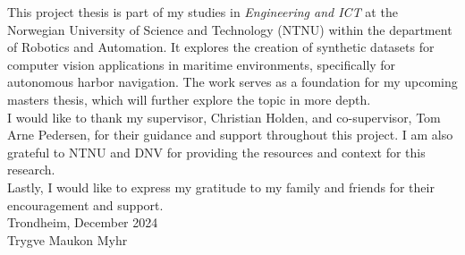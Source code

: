 
This project thesis is part of my studies in \textit{Engineering and ICT} at the Norwegian University of Science and Technology (NTNU) within the department of Robotics and Automation. It explores the creation of synthetic datasets for computer vision applications in maritime environments, specifically for autonomous harbor navigation. The work serves as a foundation for my upcoming masters thesis, which will further explore the topic in more depth.\\

\noindent I would like to thank my supervisor, Christian Holden, and co-supervisor, Tom Arne Pedersen, for their guidance and support throughout this project. I am also grateful to NTNU and DNV for providing the resources and context for this research.\\

\noindent Lastly, I would like to express my gratitude to my family and friends for their encouragement and support.\\

\noindent Trondheim, December 2024\\
\noindent Trygve Maukon Myhr